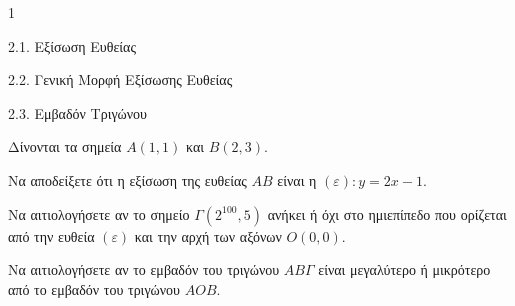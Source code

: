 \begin{ylh}{1}
    \item 2.1. Εξίσωση Ευθείας
    \item 2.2. Γενική Μορφή Εξίσωσης Ευθείας
    \item 2.3. Εμβαδόν Τριγώνου
\end{ylh}
Δίνονται τα σημεία $A(1,1)$ και $B(2,3)$.
\begin{alist}
\item Να αποδείξετε ότι η εξίσωση της ευθείας $AB$ είναι η $(\varepsilon): y=2x-1$. 
\item Να αιτιολογήσετε αν το σημείο $\Gamma(2^{100}, 5)$ ανήκει ή όχι στο ημιεπίπεδο που ορίζεται από την ευθεία $(\varepsilon)$ και την αρχή των αξόνων $O(0,0)$. 
\item Να αιτιολογήσετε αν το εμβαδόν του τριγώνου $AB\Gamma$ είναι μεγαλύτερο ή μικρότερο από το εμβαδόν του τριγώνου $AOB$. 
\end{alist}